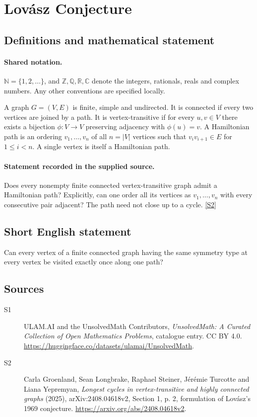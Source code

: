 \documentclass[11pt]{article}
\newcommand{\sref}[2]{\hyperlink{source:#1:#2}{[S#2]}}
\begin{document}
\section{Lovász Conjecture}\label{statement}

\subsection{Definitions and mathematical statement}

\paragraph{Shared notation.}$\mathbb N=\{1,2,\ldots\}$, and $\mathbb Z,\mathbb Q,\mathbb R,\mathbb C$ denote the integers, rationals, reals and complex numbers. Any other conventions are specified locally.


A graph $G=(V,E)$ is finite, simple and undirected. It is connected if every two vertices are joined by a path. It is vertex-transitive if for every $u,v\in V$ there exists a bijection $\phi:V\to V$ preserving adjacency with $\phi(u)=v$. A Hamiltonian path is an ordering $v_1,\ldots,v_n$ of all $n=|V|$ vertices such that $v_iv_{i+1}\in E$ for $1\le i<n$. A single vertex is itself a Hamiltonian path.
\paragraph{Statement recorded in the supplied source.}
Does every nonempty finite connected vertex-transitive graph admit a Hamiltonian path? Explicitly, can one order all its vertices as $v_1,\ldots,v_n$ with every consecutive pair adjacent? The path need not close up to a cycle. \sref{statement}{2}
\subsection{Short English statement}
Can every vertex of a finite connected graph having the same symmetry type at every vertex be visited exactly once along one path?
\subsection{Sources}
\begin{description}
\item[\hypertarget{source:statement:1}{S1}] ULAM.AI and the UnsolvedMath Contributors, \emph{UnsolvedMath: A Curated Collection of Open Mathematics Problems}, catalogue entry. CC BY 4.0. \url{https://huggingface.co/datasets/ulamai/UnsolvedMath}.
\item[\hypertarget{source:statement:2}{S2}] Carla Groenland, Sean Longbrake, Raphael Steiner, J\'er\'emie Turcotte and Liana Yepremyan, \emph{Longest cycles in vertex-transitive and highly connected graphs} (2025), arXiv:2408.04618v2, Section 1, p. 2, formulation of Lov\'asz's 1969 conjecture. \url{https://arxiv.org/abs/2408.04618v2}.
\end{description}
\label{end:statement}
\end{document}
